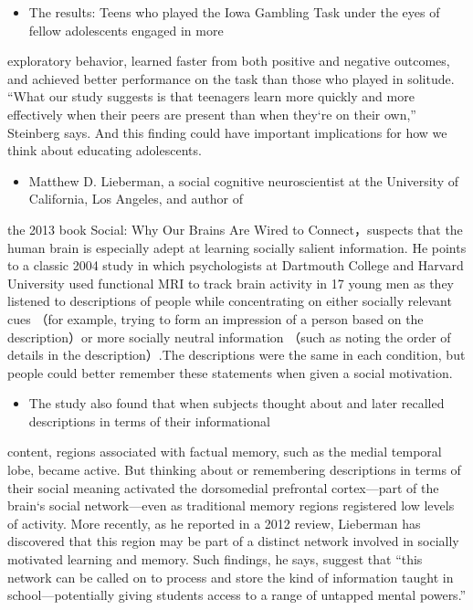 \documentclass[UTF8,11pt]{ctexart}
\begin{document}
\begin{itemize}[leftmargin=2em,itemsep=.2em,topsep=.4em]\item[G.] The results: Teens who played the Iowa Gambling Task under the eyes of fellow adolescents engaged in more
\end{itemize}

exploratory behavior, learned faster from both positive and negative outcomes, and achieved better performance on the task than those who played in solitude. “What our study suggests is that teenagers learn more quickly and more effectively when their peers are present than when they‘re on their own,” Steinberg says. And this finding could have important implications for how we think about educating adolescents.


\begin{itemize}[leftmargin=2em,itemsep=.2em,topsep=.4em]\item[H.] Matthew D. Lieberman, a social cognitive neuroscientist at the University of California, Los Angeles, and author of
\end{itemize}

the 2013 book Social: Why Our Brains Are Wired to Connect，suspects that the human brain is especially adept at learning socially salient information. He points to a classic 2004 study in which psychologists at Dartmouth College and Harvard University used functional MRI to track brain activity in 17 young men as they listened to descriptions of people while concentrating on either socially relevant cues （for example, trying to form an impression of a person based on the description）or more socially neutral information （such as noting the order of details in the description）.The descriptions were the same in each condition, but people could better remember these statements when given a social motivation.


\begin{itemize}[leftmargin=2em,itemsep=.2em,topsep=.4em]\item[I.] The study also found that when subjects thought about and later recalled descriptions in terms of their informational
\end{itemize}

content, regions associated with factual memory, such as the medial temporal lobe, became active. But thinking about or remembering descriptions in terms of their social meaning activated the dorsomedial prefrontal cortex—part of the brain‘s social network—even as traditional memory regions registered low levels of activity. More recently, as he reported in a 2012 review, Lieberman has discovered that this region may be part of a distinct network involved in socially motivated learning and memory. Such findings, he says, suggest that “this network can be called on to process and store the kind of information taught in school—potentially giving students access to a range of untapped mental powers.”
\end{document}
